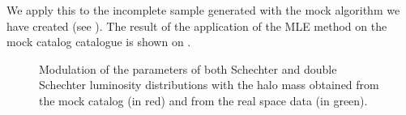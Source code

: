 We apply this to the incomplete sample generated with the mock algorithm we
have created (see ). The result of the application of
the MLE method on the mock catalog catalogue is shown on
.
%
\begin{figure}
    \centering
    \begin{minipage}{\linewidth}
    \centering
    \end{minipage}
    \begin{minipage}{\linewidth}
    \centering
    \end{minipage}
    \caption{Modulation of the parameters of both Schechter and double
    Schechter luminosity distributions with the halo mass obtained from the
mock catalog (in red) and from the real space data (in
green).\label{fig:modulation}}
\end{figure}

